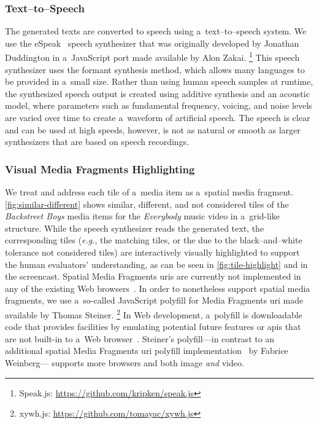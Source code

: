 \documentclass{article}
\begin{document}
\subsubsection{Text--to--Speech}

The generated texts are converted to speech using a~text--to--speech system.
We use the eSpeak~\cite{duddington2012espeak}
speech synthesizer that was originally developed by Jonathan Duddington
in a~JavaScript port made available by Alon Zakai.%
\footnote{Speak.js: \url{https://github.com/kripken/speak.js}}
This speech synthesizer uses the formant synthesis method,
which allows many languages to be provided in a~small size.
Rather than using human speech samples at runtime,
the synthesized speech output is created using additive synthesis
and an acoustic model, where parameters
such as fundamental frequency, voicing, and noise levels
are varied over time to create a~waveform of artificial speech.
The speech is clear and can be used at high speeds,
however, is not as natural or smooth as larger synthesizers
that are based on speech recordings.

\subsubsection{Visual Media Fragments Highlighting}

We treat and address each tile of a~media item as a~spatial media fragment.
\autoref{fig:similar-different} shows similar, different,
and not considered tiles of the \emph{Backstreet Boys} media items
for the \emph{Everybody} music video in a~grid-like structure.
While the speech synthesizer reads the generated text,
the corresponding tiles (\emph{e.g.}, the matching tiles,
or the due to the black--and--white tolerance not considered tiles)
are interactively visually highlighted
to support the human evaluators' understanding,
as can be seen in \autoref{fig:tile-highlight} and in the screencast.
Spatial Media Fragments {\sc uri}s are currently not implemented
in any of the existing Web browsers~\cite{weinberg2013polyfill}.
In order to nonetheless support spatial media fragments,
we use a~so-called JavaScript polyfill for Media Fragments {\sc uri}
made available by Thomas Steiner.%
\footnote{xywh.js: \url{https://github.com/tomayac/xywh.js}}
In Web development, a~polyfill is downloadable code
that provides facilities by emulating potential future features or {\sc api}s
that are not built-in to a~Web browser~\cite{sharp2010polyfill}.
Steiner's polyfill---in contrast to an additional spatial Media Fragments {\sc uri}
polyfill implementation~\cite{weinberg2013polyfill} by Fabrice Weinberg---%
supports more browsers and both image \emph{and} video.
\end{document}
